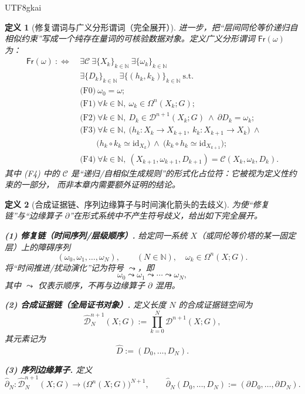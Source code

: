 \documentclass[12pt]{article}
\newtheorem{definition}{定义}[section]
\newcommand{\NN}{\mathbb{N}}
\begin{document}
\begin{CJK*}{UTF8}{gkai}
\begin{definition}[修复谓词与广义分形谓词（完全展开）]
进一步，把“层间同伦等价递归自相似约束”写成一个纯存在量词的可核验数据对象。定义广义分形谓词
$\mathsf{Fr}(\omega)$ 为：
\[
\begin{aligned}
  \mathsf{Fr}(\omega)\ :\Longleftrightarrow\
  &\exists \mathcal{C}\ \exists \{X_k\}_{k\in\NN}\ \exists \{\omega_k\}_{k\in\NN}\\
  &\exists \{D_k\}_{k\in\NN}\ \exists \{(h_k,k_k)\}_{k\in\NN}\ \text{s.t.}\\
  &\text{(F0)}\ \omega_0=\omega;\\
  &\text{(F1)}\ \forall k\in\NN,\ \omega_k\in\Omega^n(X_k;G);\\
  &\text{(F2)}\ \forall k\in\NN,\ D_k\in\mathcal{D}^{n+1}(X_k;G)\ \wedge\ \partial D_k=\omega_k;\\
  &\text{(F3)}\ \forall k\in\NN,\ \bigl(h_k:X_k\to X_{k+1},\ k_k:X_{k+1}\to X_k\bigr)\ \wedge\\
  &\qquad \bigl(h_k\circ k_k\simeq \mathrm{id}_{X_k}\bigr)\ \wedge\ \bigl(k_k\circ h_k\simeq \mathrm{id}_{X_{k+1}}\bigr);
    \\
  &\text{(F4)}\ \forall k\in\NN,\ (X_{k+1},\omega_{k+1},D_{k+1})=\mathcal{C}(X_k,\omega_k,D_k).
\end{aligned}
\]
其中 (F4) 中的 $\mathcal{C}$ 是“递归/自相似生成规则”的形式化占位符：它被视为\emph{定义性约束}的一部分，
而非本章内需要额外证明的结论。
\end{definition}

\begin{definition}[合成证据链、序列边缘算子与时间演化箭头的去歧义]
\label{def:tex29-composed-evidence}
为使“修复链”与“边缘算子 $\partial$”在形式系统中不产生符号歧义，给出如下完全展开。

\textbf{(1) 修复链（时间序列/层级顺序）.}
给定同一系统 $X$（或同伦等价塔的某一固定层）上的障碍序列
\[
  (\omega_0,\omega_1,\dots,\omega_N),\qquad (N\in\NN),\quad \omega_k\in\Omega^n(X;G).
\]
将“时间推进/扰动演化”记为符号 $\leadsto$，即
\[
  \omega_0 \leadsto \omega_1 \leadsto \cdots \leadsto \omega_N,
\]
其中 $\leadsto$ \emph{仅表示顺序}，不再与边缘算子 $\partial$ 混用。

\textbf{(2) 合成证据链（全局证书对象）.}
定义长度 $N$ 的合成证据链空间为
\[
  \widehat{\mathcal{D}}^{n+1}_N(X;G):=\prod_{k=0}^N \mathcal{D}^{n+1}(X;G),
\]
其元素记为
\[
  \widehat{D}:=(D_0,\dots,D_N).
\]

\textbf{(3) 序列边缘算子.}
定义
\[
  \widehat{\partial}_N:\widehat{\mathcal{D}}^{n+1}_N(X;G)\to \bigl(\Omega^n(X;G)\bigr)^{N+1},
  \qquad
  \widehat{\partial}_N(D_0,\dots,D_N):=(\partial D_0,\dots,\partial D_N).
\]


\end{definition}
\end{CJK*}
\end{document}

